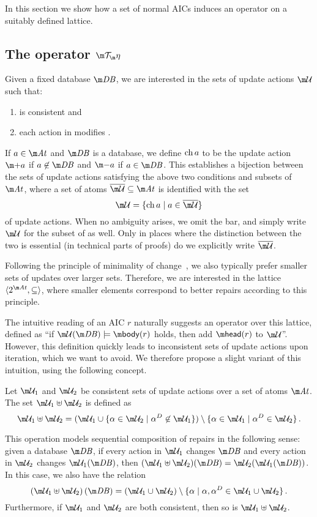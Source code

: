 In this section we show how a set of normal AICs induces an operator on a suitably defined lattice.

\subsection{The operator $\Op$}

Given a fixed database $\db$, we are interested in the sets of update actions $\UU$ such that:
\begin{enumerate}
\item \UU is consistent and 
\item each action in \UU modifies \db.
\end{enumerate}
If $a\in \atoms$ and $\db$ is a database, we define $\operatorname{ch} a$ to be the update action $\add a$ if $a\not\in \db$ and $\remove a$ if $a \in \db$.
This establishes a bijection between the sets of update actions satisfying the above two conditions and subsets of $\atoms$, where a set of atoms $\overline\UU\subseteq\atoms$ is identified with the set 
\[\UU = \{\change a\mid a \in \overline \UU \}\]
of update actions.
When no ambiguity arises, we omit the bar, and simply write $\UU$ for the subset of \atoms as well.
Only in places where the distinction between the two is essential (in technical parts of proofs) do we explicitly write $\overline\UU$.

Following the principle of minimality of change~\cite{Winslett90,ai/EiterG92}, we also typically prefer smaller sets of updates over larger sets.
Therefore, we are interested in the lattice $\langle 2^{\atoms},\subseteq\rangle$, where smaller elements correspond to better repairs according to this principle.

The intuitive reading of an AIC $r$ naturally suggests an operator over this lattice, defined as ``if $\UU(\db)\models\body(r)$ holds, then add $\head(r)$ to $\UU$''.
However, this definition quickly leads to inconsistent sets of update actions upon iteration, which we want to avoid.
We therefore propose a slight variant of this intuition, using the following concept.

\begin{definition}
  Let $\UU_1$ and $\UU_2$ be consistent sets of update actions over a set of atoms $\atoms$.
  The set $\UU_1\uplus\UU_2$ is defined as
  \[\UU_1\uplus\UU_2 = (\UU_1\cup\{\alpha\in\UU_2\mid\alpha^D\not\in\UU_1\})\setminus\{\alpha\in\UU_1\mid\alpha^D\in\UU_2\}\,.\]
\end{definition}
This operation models sequential composition of repairs in the following sense: given a database $\db$, if every action in $\UU_1$ changes $\db$ and every action in $\UU_2$ changes $\UU_1(\db)$, then $(\UU_1\uplus\UU_2)(\db)=\UU_2(\UU_1(\db))$.
In this case, we also have the relation
\[\left(\UU_1\uplus \UU_2\right)(\db) = \left(\UU_1\cup \UU_2\right) \setminus \{\alpha \mid \alpha,\alpha^D\in \UU_1\cup\UU_2\}\,.\]
Furthermore, if $\UU_1$ and $\UU_2$ are both consistent, then so is $\UU_1\uplus\UU_2$.

